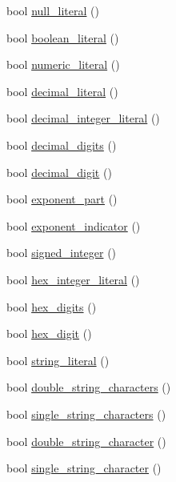 \begin{DoxyCompactItemize}
\item 
bool \hyperlink{class_lexical_grammar_a2bd963802a60b5d0e1476bdf3019494b}{null\+\_\+literal} ()
\item 
bool \hyperlink{class_lexical_grammar_a80b7dcb7b99bbd553581cd162cd80cb1}{boolean\+\_\+literal} ()
\item 
bool \hyperlink{class_lexical_grammar_a6dd9a9a8baf50e9a99e0df2cbaa8d795}{numeric\+\_\+literal} ()
\item 
bool \hyperlink{class_lexical_grammar_aa4b1f1f944befbe96ee450a0399e85df}{decimal\+\_\+literal} ()
\item 
bool \hyperlink{class_lexical_grammar_afb8b57c8a9457981b9d99704ee78c066}{decimal\+\_\+integer\+\_\+literal} ()
\item 
bool \hyperlink{class_lexical_grammar_a434f04e5a69d078a98dcf9163835dad0}{decimal\+\_\+digits} ()
\item 
bool \hyperlink{class_lexical_grammar_a013dbcda735a0c6c61970de8bd65c0fe}{decimal\+\_\+digit} ()
\item 
bool \hyperlink{class_lexical_grammar_a295f7a8841c4b098113e0a43401488fc}{exponent\+\_\+part} ()
\item 
bool \hyperlink{class_lexical_grammar_a45135be3081ddcdbb776555a6819d45f}{exponent\+\_\+indicator} ()
\item 
bool \hyperlink{class_lexical_grammar_a97e84269213615dc97e8622fc96d0f4c}{signed\+\_\+integer} ()
\item 
bool \hyperlink{class_lexical_grammar_aca046d0a2eacbece1c05fb59548efdbd}{hex\+\_\+integer\+\_\+literal} ()
\item 
bool \hyperlink{class_lexical_grammar_aeace42ff820851c2d59b3d0582cb2e5d}{hex\+\_\+digits} ()
\item 
bool \hyperlink{class_lexical_grammar_afa260bdb5dc9224215a68ba07cce3a4a}{hex\+\_\+digit} ()
\item 
bool \hyperlink{class_lexical_grammar_a11294149e962d00a92cacc8c6567cdc5}{string\+\_\+literal} ()
\item 
bool \hyperlink{class_lexical_grammar_aab6bf886c515b469bfd7bf034148c9ee}{double\+\_\+string\+\_\+characters} ()
\item 
bool \hyperlink{class_lexical_grammar_a881666d88772759f7e2f532150b6bf93}{single\+\_\+string\+\_\+characters} ()
\item 
bool \hyperlink{class_lexical_grammar_a473842f8e78b003d65e4459eec57bf8d}{double\+\_\+string\+\_\+character} ()
\item 
bool \hyperlink{class_lexical_grammar_ae052b9eae96cf939b760c0f5e6cdfdfa}{single\+\_\+string\+\_\+character} ()

\end{DoxyCompactItemize}

